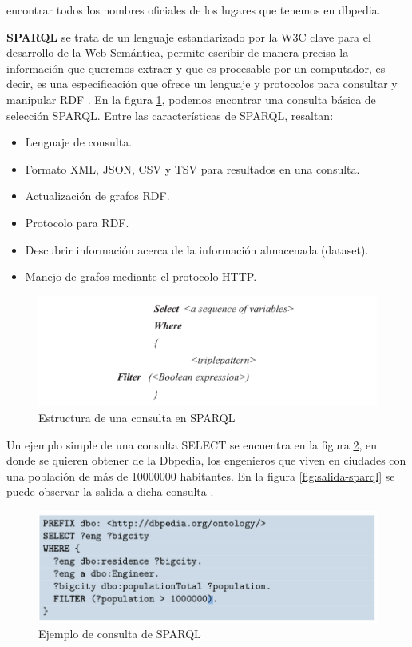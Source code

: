 encontrar todos los nombres oficiales de los lugares que tenemos en dbpedia.

\textbf{SPARQL} se trata de un lenguaje estandarizado por la W3C clave para el desarrollo de la Web Semántica, permite escribir de manera precisa la información que queremos extraer y que es procesable por un computador, es decir, es una especificación que ofrece un lenguaje y protocolos para consultar y manipular RDF \cite{tesis-otro}. En la figura \ref{fig:sparql}, podemos encontrar una consulta básica de selección SPARQL. Entre las características de SPARQL, resaltan: 

\begin{itemize}
	\item Lenguaje de consulta.
	\item Formato XML, JSON, CSV y TSV  para resultados en una consulta.
	\item Actualización de grafos RDF.
	\item Protocolo para RDF.
	\item Descubrir información acerca de la información  almacenada (dataset). 
	\item Manejo de grafos mediante el protocolo HTTP. 
\end{itemize}

\begin{figure}[H]
	\centering
	\includegraphics[width=1\linewidth]{imagenes/capitulo3/sparql}
	\caption{Estructura de una consulta en SPARQL}
	\label{fig:sparql}
\end{figure}

Un ejemplo simple de una consulta SELECT se encuentra en la figura \ref{fig:ejemplo-sparql}, en donde se quieren obtener de la Dbpedia, los engenieros que viven en ciudades con una población de más de 10000000 habitantes. En la figura \ref{fig:salida-sparql} se puede observar la salida a dicha consulta \cite{tesis-otro}.

\begin{figure}[H]
	\centering
	\includegraphics[width=0.7\linewidth]{imagenes/capitulo3/ejemplo-sparql}
	\caption{Ejemplo de consulta de SPARQL}
	\label{fig:ejemplo-sparql}
\end{figure}

